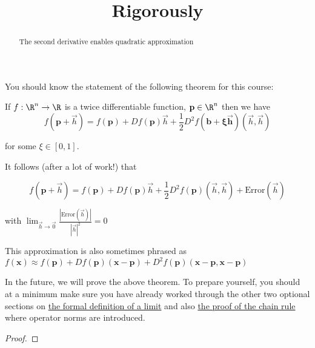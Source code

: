 \documentclass{ximera}
\title{Rigorously}
\begin{document}
	\begin{abstract}
		The second derivative enables quadratic approximation
	\end{abstract}\maketitle
	
	You should know the statement of the following theorem for this course:
	
	\begin{theorem}
		If $f:\R^n \to \R$ is a twice differentiable function, $\mathbf{p} \in \R^n$ then we have
		\[
			f(\mathbf{p} + \vec{h}) = f(\mathbf{p})+ Df(\mathbf{p})\vec{h}+\frac{1}{2}D^2f(\mathbf{b+\xi\vec{h}})(\vec{h},\vec{h})
		\]
		
		for some $\xi \in [0,1]$.
		
		It follows (after a lot of work!) that
		
		\[
			f(\mathbf{p} + \vec{h}) = f(\mathbf{p})+ Df(\mathbf{p})\vec{h}+\frac{1}{2}D^2f(\mathbf{p})(\vec{h},\vec{h})+ \textrm{Error}(\vec{h})
		\]
		
		with $\displaystyle\lim_{\vec{h} \to \vec{0}} \frac{|\textrm{Error}(\vec{h})|}{|\vec{h}|^2} = 0$
	\end{theorem}
	
	This approximation is also sometimes phrased as 
	$f(\mathbf{x}) \approx f(\mathbf{p}) + Df(\mathbf{p})(\mathbf{x}-\mathbf{p})+D^2f(\mathbf{p})(\mathbf{x}-\mathbf{p},\mathbf{x}-\mathbf{p})$
	
	In the future, we will prove the above theorem. 	To prepare yourself, you should at a minimum make sure you have already worked through 
	the other two optional sections on \href{http://ximera.osu.edu/course/kisonecat/m2o2c2/course/activity/week2/limits/formal-limit/}{the formal definition of a limit} 
	and also \href{http://ximera.osu.edu/course/kisonecat/m2o2c2/course/activity/week2/chain-rule/proof/}{ the proof of the chain rule} where operator norms are introduced.
	
	\begin{proof}
	\end{proof}

	
	
\end{document}
